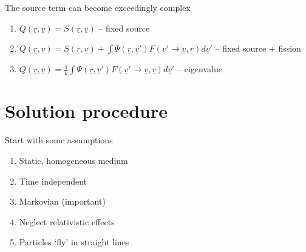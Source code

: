 \documentclass[aspectratio=1610,pdftex,dvipsnames,compress,xcolor={dvipsnames}]{beamer}
\begin{document}
\begin{frame}{The source term can become exceedingly complex}
    \begin{enumerate}[series=outerlist,topsep=0pt,itemsep=21pt,leftmargin=*,label=(\arabic*)]
        \item[]$Q(\underline{r},\underline{v}) = S(\underline{r},\underline{v})$ -- fixed source
        \item[]$Q(\underline{r},\underline{v})= S(\underline{r},\underline{v}) + \int \Psi(\underline{r},\underline{v}') F(\underline{v}' \rightarrow \underline{v},\underline{r}) d\underline{v}'$ -- fixed source + fission
        \item[]$Q(\underline{r},\underline{v}) = \frac{1}{k} \int \Psi(\underline{r},\underline{v}') F(\underline{v}' \rightarrow \underline{v},\underline{r}) d\underline{v}'$ -- eigenvalue
    \end{enumerate}
\end{frame}


\section{Solution procedure}


\addtocounter{framenumber}{-1} 
\begin{frame}{Start with some assumptions}
    \begin{enumerate}[series=outerlist,topsep=0pt,itemsep=21pt,leftmargin=*,label=(\arabic*)]
        \item[]Static, homogeneous medium
        \item[]Time independent
        \item[]Markovian (important)
        \item[]Neglect relativistic effects
        \item[]Particles `fly' in straight lines
    \end{enumerate}
\end{frame}
\end{document}
